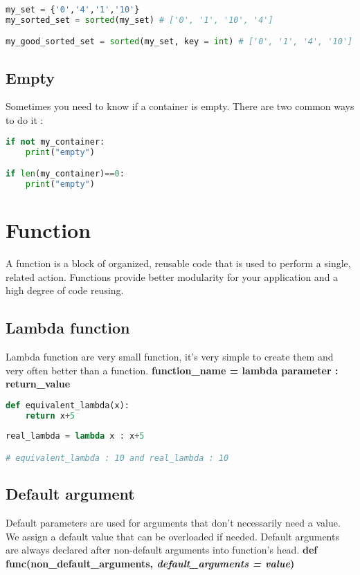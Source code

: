 \documentclass[a4paper, 12pt, titlepage]{scrartcl} %
\begin{document}
\begin{lstlisting}[language=Python]
my_set = {'0','4','1','10'}
my_sorted_set = sorted(my_set) # ['0', '1', '10', '4']

my_good_sorted_set = sorted(my_set, key = int) # ['0', '1', '4', '10']
\end{lstlisting} \vspace{5mm}

\subsection{Empty}
Sometimes you need to know if a container is empty. There are two common ways to do it :
\begin{lstlisting}[language=Python]
if not my_container:
    print("empty")

if len(my_container)==0:
    print("empty")
\end{lstlisting} \vspace{5mm}


\newpage
\section{Function}
\label{sec:Function}
A function is a block of organized, reusable code that is used to perform a single, related action. Functions provide better modularity for your application and a high degree of code reusing.

\subsection{Lambda function}
\label{subsec:Lambda}
Lambda function are very small function, it's very simple to create them and very often better than a function. \textbf{function\_name = lambda parameter : return\_value}
\begin{lstlisting}[language=Python]
def equivalent_lambda(x):
	return x+5
	
real_lambda = lambda x : x+5

# equivalent_lambda : 10 and real_lambda : 10
\end{lstlisting} \vspace{5mm}

\subsection{Default argument}
Default parameters are used for arguments that don't necessarily need a value. We assign a default value that can be overloaded if needed. Default arguments are always declared after non-default arguments into function's head. \textbf{def func(non\_default\_arguments, \textit{default\_arguments = value})}
\end{document}
